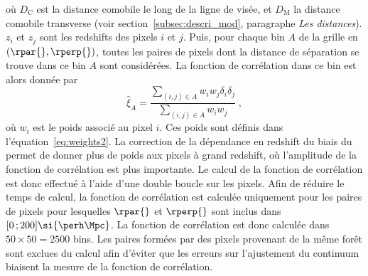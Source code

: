 où $D_{\mathrm{C}}$ est la distance comobile le long de la ligne de visée, et $D_{\mathrm{M}}$ la distance comobile transverse (voir section~\ref{subsec:descri_mod}, paragraphe \emph{Les distances}). $z_i$ et $z_j$ sont les redshifts des pixels $i$ et $j$.
Puis, pour chaque bin $A$ de la grille en $(\rpar{}, \rperp{})$, toutes les paires de pixels dont la distance de séparation se trouve dans ce bin $A$ sont considérées. La fonction de corrélation dans ce bin est alors donnée par
\begin{equation}
  \label{eq:xiff}
\hat  \xi_A = \frac{
    \sum\limits_{(i,j)\in A} w_i w_j \delta_i \delta_j
  }{
    \sum\limits_{(i,j)\in A} w_i w_j
  }
  \; ,
\end{equation}
où $w_i$ est le poids associé au pixel $i$. Ces poids sont définis dans l'équation~\ref{eq:weights2}. La correction de la dépendance en redshift du biais du \lya{} permet de donner plus de poids aux pixels à grand redshift, où l'amplitude de la fonction de corrélation est plus importante.
Le calcul de la fonction de corrélation est donc effectué à l'aide d'une double boucle sur les pixels.
Afin de réduire le temps de calcul, la fonction de corrélation est calculée uniquement pour les paires de pixels pour lesquelles $\rpar{}$ et $\rperp{}$ sont inclus dans $[0 \, ; 200] \si{\perh\Mpc}$. La fonction de corrélation est donc calculée dans $50 \times 50 = \num{2500}$ bins.
Les paires formées par des pixels provenant de la même forêt sont exclues du calcul afin d'éviter que les erreurs sur l'ajustement du continuum biaisent la mesure de la fonction de corrélation.

